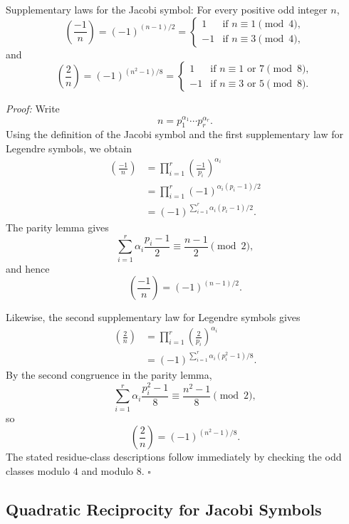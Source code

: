 \documentclass[a4paper,11pt,abstracton]{scrartcl}
\theoremstyle{dotlessP}
\theoremstyle{dotlessS}
\theoremstyle{remark}
\theoremstyle{definition}
\begin{document}
\begin{mainbox}{Supplementary laws for the Jacobi symbol:}
For every positive odd integer $n$,
\[
    \left(\frac{-1}{n}\right)=(-1)^{(n-1)/2}
      =
      \begin{cases}
          1 & \text{if $n\equiv1\pmod4$},\\
         -1 & \text{if $n\equiv3\pmod4$},
      \end{cases}
\]
and
\[
    \left(\frac2n\right)=(-1)^{(n^2-1)/8}
      =
      \begin{cases}
          1 & \text{if $n\equiv1$ or $7\pmod8$},\\
         -1 & \text{if $n\equiv3$ or $5\pmod8$}.
      \end{cases}
\]
\end{mainbox}

\begin{claim_box}
\textit{Proof:}
Write
\[
    n=p_1^{\alpha_1}\cdots p_r^{\alpha_r}.
\]
Using the definition of the Jacobi symbol and the first supplementary
law for Legendre symbols, we obtain
\begin{align*}
    \left(\frac{-1}{n}\right)
      &=\prod_{i=1}^{r}
        \left(\frac{-1}{p_i}\right)^{\alpha_i}\\
      &=\prod_{i=1}^{r}
        (-1)^{\alpha_i(p_i-1)/2}\\
      &=(-1)^{\sum_{i=1}^{r}
        \alpha_i(p_i-1)/2}.
\end{align*}
The parity lemma gives
\[
    \sum_{i=1}^{r}\alpha_i\frac{p_i-1}{2}
      \equiv\frac{n-1}{2}\pmod2,
\]
and hence
\[
    \left(\frac{-1}{n}\right)=(-1)^{(n-1)/2}.
\]

Likewise, the second supplementary law for Legendre symbols gives
\begin{align*}
    \left(\frac2n\right)
      &=\prod_{i=1}^{r}
        \left(\frac2{p_i}\right)^{\alpha_i}\\
      &=(-1)^{\sum_{i=1}^{r}
        \alpha_i(p_i^2-1)/8}.
\end{align*}
By the second congruence in the parity lemma,
\[
    \sum_{i=1}^{r}\alpha_i\frac{p_i^2-1}{8}
      \equiv\frac{n^2-1}{8}\pmod2,
\]
so
\[
    \left(\frac2n\right)=(-1)^{(n^2-1)/8}.
\]
The stated residue-class descriptions follow immediately by checking
the odd classes modulo $4$ and modulo $8$.
\hfill$\square$
\end{claim_box}

\subsection{Quadratic Reciprocity for Jacobi Symbols}
\end{document}
